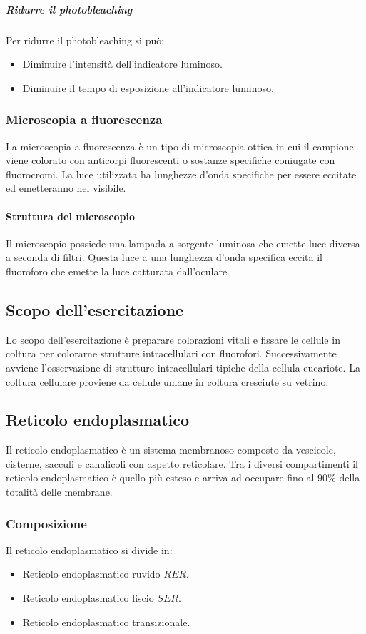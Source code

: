 				\subparagraph{Ridurre il photobleaching}
				Per ridurre il photobleaching si pu\`o:
				\begin{itemize}
					\item Diminuire l'intensit\`a dell'indicatore luminoso.
					\item Diminuire il tempo di esposizione all'indicatore luminoso.
				\end{itemize}

		\subsubsection{Microscopia a fluorescenza}
		La microscopia a fluorescenza \`e un tipo di microscopia ottica in cui il campione viene colorato con anticorpi fluorescenti o sostanze specifiche coniugate con fluorocromi.
		La luce utilizzata ha lunghezze d'onda specifiche per essere eccitate ed emetteranno nel visibile.

			\paragraph{Struttura del microscopio}
			Il microscopio possiede una lampada a sorgente luminosa che emette luce diversa a seconda di filtri.
			Questa luce a una lunghezza d'onda specifica eccita il fluoroforo che emette la luce catturata dall'oculare.

	\subsection{Scopo dell'esercitazione}
	Lo scopo dell'esercitazione \`e preparare colorazioni vitali e fissare le cellule in coltura per colorarne strutture intracellulari con fluorofori.
	Successivamente avviene l'osservazione di strutture intracellulari tipiche della cellula eucariote.
	La coltura cellulare proviene da cellule umane in coltura cresciute su vetrino.

	\subsection{Reticolo endoplasmatico}
	Il reticolo endoplasmatico \`e un sistema membranoso composto da vescicole, cisterne, sacculi e canalicoli con aspetto reticolare.
	Tra i diversi compartimenti il reticolo endoplasmatico \`e quello pi\`u esteso e arriva ad occupare fino al $90\%$ della totalit\`a delle membrane.

		\subsubsection{Composizione}
		Il reticolo endoplasmatico si divide in:
		\begin{itemize}
			\item Reticolo endoplasmatico ruvido $RER$.
			\item Reticolo endoplasmatico liscio $SER$.
			\item Reticolo endoplasmatico transizionale.
		\end{itemize}


